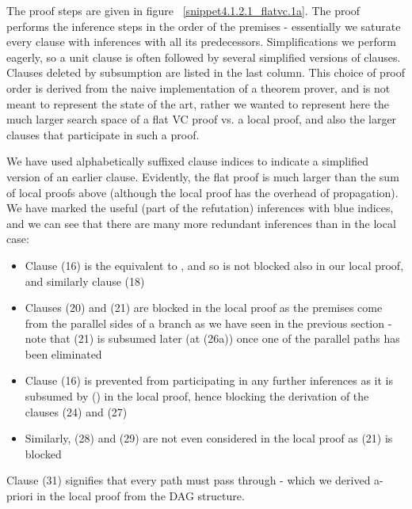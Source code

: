 The proof steps are given in figure ~\ref{snippet4.1.2.1_flatvc.1a}.
The proof performs the inference steps in the order of the premises - essentially we saturate every clause with inferences with all its predecessors.
Simplifications we perform eagerly, so a unit clause is often followed by several simplified versions of clauses.
Clauses deleted by subsumption are listed in the last column.
This choice of proof order is derived from the naive implementation of a theorem prover, and is not meant to represent the state of the art, 
rather we wanted to represent here the much larger search space of a flat VC proof vs. a local proof, 
and also the larger clauses that participate in such a proof.

We have used alphabetically suffixed clause indices to indicate a simplified version of an earlier clause.
Evidently, the flat proof is much larger than the sum of local proofs above (although the local proof has the overhead of propagation).
We have marked the useful (part of the refutation) inferences with blue indices, and we can see that there are many more redundant inferences than in the local case:
\begin{itemize}
	\item Clause (16) is the equivalent to , and so is not blocked also in our local proof, and similarly clause (18)
	\item Clauses (20) and (21) are blocked in the local proof as the premises come from the parallel sides of a branch as we have seen in the previous section - 
	note that (21) is subsumed later (at (26a)) once one of the parallel paths has been eliminated
	\item Clause (16) is prevented from participating in any further inferences as it is subsumed by () in the local proof, hence blocking the derivation of the clauses (24) and (27)
	\item Similarly, (28) and (29) are not even considered in the local proof as (21) is blocked
\end{itemize}
Clause (31) signifies that every path must pass through  - which we derived a-priori in the local proof from the DAG structure.


